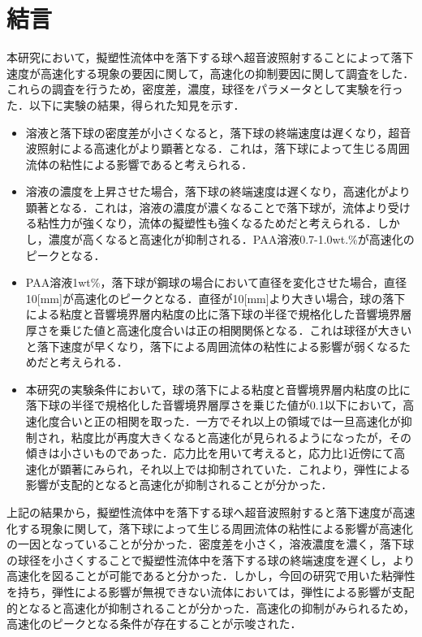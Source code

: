 \section{結言}
本研究において，擬塑性流体中を落下する球へ超音波照射することによって落下速度が高速化する現象の要因に関して，高速化の抑制要因に関して調査をした．これらの調査を行うため，密度差，濃度，球径をパラメータとして実験を行った．以下に実験の結果，得られた知見を示す．

\begin{itemize}
    \item 溶液と落下球の密度差が小さくなると，落下球の終端速度は遅くなり，超音波照射による高速化がより顕著となる．これは，落下球によって生じる周囲流体の粘性による影響であると考えられる．
    \item 溶液の濃度を上昇させた場合，落下球の終端速度は遅くなり，高速化がより顕著となる．これは，溶液の濃度が濃くなることで落下球が，流体より受ける粘性力が強くなり，流体の擬塑性も強くなるためだと考えられる．しかし，濃度が高くなると高速化が抑制される．PAA溶液0.7-1.0wt.\%が高速化のピークとなる．
    \item PAA溶液1wt\%，落下球が鋼球の場合において直径を変化させた場合，直径10[mm]が高速化のピークとなる．直径が10[mm]より大きい場合，球の落下による粘度と音響境界層内粘度の比に落下球の半径で規格化した音響境界層厚さを乗じた値と高速化度合いは正の相関関係となる．これは球径が大きいと落下速度が早くなり，落下による周囲流体の粘性による影響が弱くなるためだと考えられる．
    \item 本研究の実験条件において，球の落下による粘度と音響境界層内粘度の比に落下球の半径で規格化した音響境界層厚さを乗じた値が0.1以下において，高速化度合いと正の相関を取った．一方でそれ以上の領域では一旦高速化が抑制され，粘度比が再度大きくなると高速化が見られるようになったが，その傾きは小さいものであった．応力比を用いて考えると，応力比1近傍にて高速化が顕著にみられ，それ以上では抑制されていた．これより，弾性による影響が支配的となると高速化が抑制されることが分かった．
\end{itemize}

上記の結果から，擬塑性流体中を落下する球へ超音波照射すると落下速度が高速化する現象に関して，落下球によって生じる周囲流体の粘性による影響が高速化の一因となっていることが分かった．密度差を小さく，溶液濃度を濃く，落下球の球径を小さくすることで擬塑性流体中を落下する球の終端速度を遅くし，より高速化を図ることが可能であると分かった．しかし，今回の研究で用いた粘弾性を持ち，弾性による影響が無視できない流体においては，弾性による影響が支配的となると高速化が抑制されることが分かった．高速化の抑制がみられるため，高速化のピークとなる条件が存在することが示唆された．
